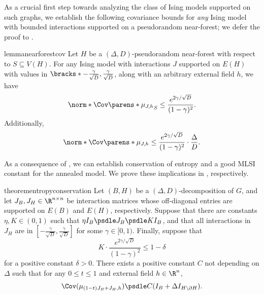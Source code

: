 \documentclass[11pt,letterpaper]{article}
\begin{document}
    As a crucial first step towards analyzing the class of Ising models supported on such graphs, we establish the following covariance bounds for \emph{any} Ising model with bounded interactions supported on a pseudorandom near-forest; we defer the proof to . 
    \begin{restatable}{lemma}{nearforestcov}
        \label{lem:near-forest-cov}
        Let $H$ be a $(\Delta,D)$-pseudorandom near-forest with respect to $S \subseteq V(H)$.
        For any Ising model with interactions $J$ supported on $E(H)$ with values in $\bracks*{-\frac{\gamma}{\sqrt{D}}, \frac{\gamma}{\sqrt{D}}}$, along with an arbitrary external field $h$, we have
        \[
            \norm*{\Cov\parens*{\mu_{J,h}}_S} \le \frac{e^{2\gamma/\sqrt{D}}}{(1-\gamma)^2}.
        \]
        Additionally,
        \[
            \norm*{\Cov\parens*{\mu_{J,h}}} \le \frac{e^{2\gamma/\sqrt{D}}}{(1-\gamma)^2} \cdot \frac{\Delta}{D}.
        \]
    \end{restatable}

    As a consequence of , we can establish conservation of entropy and a good MLSI constant for the annealed model. We prove these implications in , respectively.

    \begin{restatable}{theorem}{entropyconservation}
        \label{thm:entropy-conservation}
        Let $(B, H)$ be a $(\Delta, D)$-decomposition of $G$, and let $J_B, J_H \in \R^{n \times n}$ be interaction matrices whose off-diagonal entries are supported on $E(B)$ and $E(H)$, respectively. Suppose that there are constants $\eta, K \in (0, 1)$ such that $\eta I_B \psdle J_B \psdle K I_B$, and that all interactions in $J_H$ are in $\left[ - \frac{\gamma}{\sqrt{D}} , \frac{\gamma}{\sqrt{D}} \right]$ for some $\gamma \in [0, 1)$. Finally, suppose that 
        \[
            K \cdot \frac{e^{2\gamma/\sqrt{D}}}{(1-\gamma)^2} \le 1 - \delta
        \]
        for a positive constant $\delta > 0$.
        There exists a positive constant $C$ not depending on $\Delta$ such that for any $0 \le t \le 1$ and external field $h \in \R^{n}$,
        \[ \Cov(\mu_{(1-t)J_B + J_H,h}) \psdle C (I_B + \Delta I_{H \setminus \partial H}). \]
    \end{restatable}
    
\end{document}

